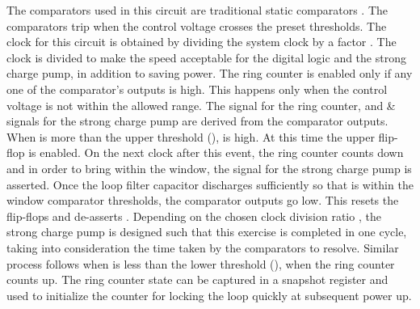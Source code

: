 \documentclass[journal,twoside,letterpaper]{IEEEtran}
\begin{document}
The comparators used in this circuit are traditional 
static comparators \cite{baker_cmos}.
The comparators trip when the control voltage crosses
the preset thresholds.
The clock for this circuit is obtained by dividing the system clock 
by a factor .
The clock is divided to make the speed acceptable for the 
digital logic and the strong charge pump, in addition to saving power.
The ring counter is enabled only if any one of the comparator's outputs
is high. This happens only when the control voltage is not within the allowed
range. The  signal for the ring counter, and 
 \&  signals for the strong 
charge pump are derived from the 
comparator outputs. When  is more than 
the upper threshold (),
 is high. At this time the upper flip-flop is enabled.
On the next clock after this event, the ring counter counts down and in
order to bring  within the window, the  signal for the
strong charge pump is asserted. Once the loop filter capacitor discharges 
sufficiently so that  is within the window comparator
thresholds, the comparator outputs go low. This resets the
flip-flops and de-asserts . 
Depending on the chosen clock division ratio ,
the strong charge pump is designed
such that this exercise is completed in one cycle,
taking into consideration the time taken by the comparators to resolve.
Similar process follows
when  is less than the lower threshold (),
when the ring counter counts up.
The ring counter state can be
captured in a snapshot register and used to initialize
the counter for locking the loop quickly at subsequent power up.
\end{document}
